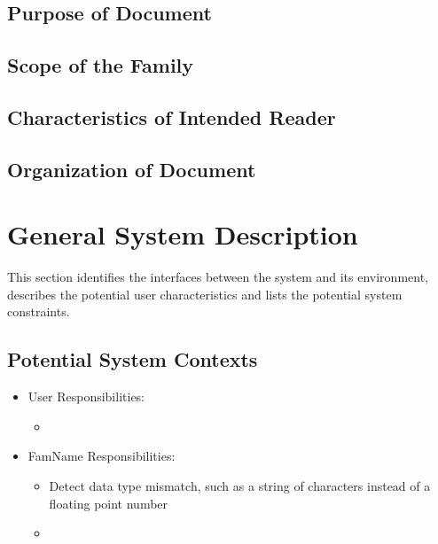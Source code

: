 \documentclass[12pt]{article}
\newcommand{\famname}{FamName} %
\begin{document}

\subsection{Purpose of Document}

\subsection{Scope of the Family}

\subsection{Characteristics of Intended Reader}

\subsection{Organization of Document}

\section{General System Description}

This section identifies the interfaces between the system and its environment, describes the
potential user characteristics and lists the potential system constraints.

\subsection{Potential System Contexts}


\begin{itemize}
  \item User Responsibilities:
        \begin{itemize}
          \item
        \end{itemize}
  \item \famname{} Responsibilities:
        \begin{itemize}
          \item Detect data type mismatch, such as a string of characters instead of a floating point number \item
        \end{itemize}
\end{itemize}
\end{document}
